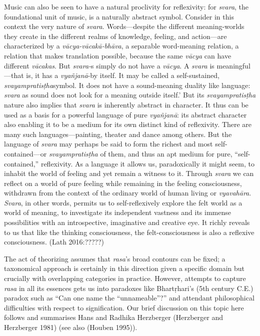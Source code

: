 \begin{myquote}
Music can also be seen to have a natural proclivity for reflexivity: for \textsl{svara}, the foundational unit of music, is a naturally abstract symbol. Consider in this context the very nature of \textsl{svara}. Words—despite the different meaning-worlds they create in the different realms of knowledge, feeling, and action—are characterized by a \textsl{vācya-vācakā-bhāva}, a separable word-meaning relation, a relation that makes translation possible, because the same \textsl{vācya} can have different \textsl{vācakas}. But \textsl{svara-}s simply do not have a \textsl{vācya}. A \textsl{svara} is meaningful—that is, it has a \textsl{vyañjanā}-by itself. It may be called a self-sustained, \textsl{svayampratisṭha}symbol. It does not have a sound-meaning duality like language: \textsl{svara} as sound does not look for a meaning outside itself.' But its \textsl{svayampratisṭha} nature also implies that \textsl{svara} is inherently abstract in character. It thus can be used as a basis for a powerful language of pure \textsl{vyañjanā}: its abstract character also enabling it to be a medium for its own distinct kind of reflexivity. There are many such languages—painting, theater and dance among others. But the language of \textsl{svara} may perhaps be said to form the richest and most self-contained—or \textsl{svayampratisṭha} of them, and thus an apt medium for pure, “self-contained,” reflexivity. As a language it allows us, paradoxically it might seem, to inhabit the world of feeling and yet remain a witness to it. Through \textsl{svara} we can reflect on a world of pure feeling while remaining in the feeling consciousness, withdrawn from the context of the ordinary world of human living or \textsl{vyavahāra}. \textsl{Svara}, in other words, permits us to self-reflexively explore the felt world as a world of meaning, to investigate its independent vastness and its immense possibilities with an introspective, imaginative and creative eye. It richly reveals to us that like the thinking consciousness, the felt-consciousness is also a reflexive consciousness. 
\hfill(Lath 2016:?????)
\end{myquote}

The act of theorizing assumes that \textsl{rasa}’s broad contours can be fixed; a taxonomical approach is certainly in this direction given a specific domain but crucially with overlapping categories in practice. However, attempts to capture \textsl{rasa} in all its essences gets us into paradoxes like Bhartṛhari's (5th century C.E.) paradox such as “Can one name the “unnameable”?” and attendant philosophical difficulties with respect to signification. Our brief discussion on this topic here follows and summarises Hans and Radhika Herzberger (Herzberger and Herzberger 1981) (see also (Houben 1995)).

